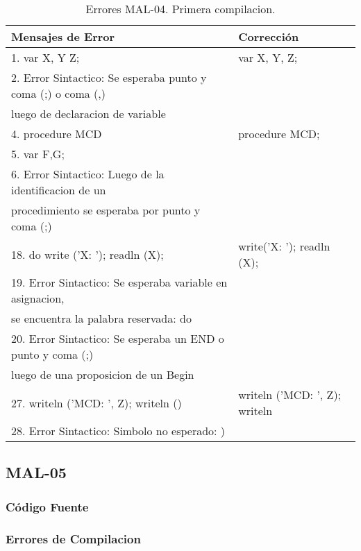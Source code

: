 \documentclass[a4paper,12pt]{article}
\begin{document}
\begin{table}[H]
\centering
\begin{tabular}{|l|l|}
\hline
Mensajes de Error & Corrección\\
\hline
1. var X, Y Z;												&var X, Y, Z;\\
2. Error Sintactico: Se esperaba punto y coma (;) o coma (,) 	&\\
luego de declaracion de variable								&\\
\hline
4. procedure MCD												& procedure MCD;\\
5. var F,G;													&\\
6. Error Sintactico: Luego de la identificacion de un 		&\\
procedimiento se esperaba por punto y coma (;)				&\\
\hline
18. do write ('X: '); readln (X);							& write('X: '); readln (X);\\
19. Error Sintactico: Se esperaba variable en asignacion, 	&\\
se encuentra la palabra reservada: do						&\\
20. Error Sintactico: Se esperaba un END o punto y coma (;) 	&\\
luego de una proposicion de un Begin							&\\
\hline
27. writeln ('MCD: ', Z); writeln ()							&writeln ('MCD: ', Z); writeln\\
28. Error Sintactico: Simbolo no esperado: ) 				&\\
\hline
\end{tabular}
\caption{Errores MAL-04. Primera compilacion.}
\label{MAL-04-1}
\end{table}

\subsection{MAL-05}
\subsubsection{Código Fuente}

\subsubsection{Errores de Compilacion}
\end{document}
